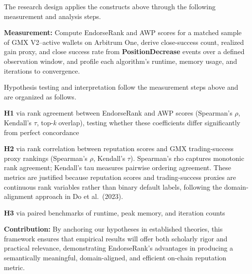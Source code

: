 The research design applies the constructs above through the following measurement and analysis steps.

\textbf{Measurement: }Compute EndorseRank and AWP scores for a matched sample of GMX V2--active wallets on Arbitrum One, derive close-success count, realized gain proxy, and close success rate from \textbf{PositionDecrease} events over a defined observation window, and profile each algorithm's runtime, memory usage, and iterations to convergence.


Hypothesis testing and interpretation follow the measurement steps above and are organized as follows.



\textbf{H1 }via rank agreement between EndorseRank and AWP scores (Spearman's \emph{\(\rho\)}, Kendall's \emph{\(\tau\)}, top-\emph{k} overlap), testing whether these coefficients differ significantly from perfect concordance


\textbf{H2 }via rank correlation between reputation scores and GMX trading-success proxy rankings (Spearman's \emph{\(\rho\)}, Kendall's \emph{\(\tau\)}). Spearman's rho captures monotonic rank agreement; Kendall's tau measures pairwise ordering agreement. These metrics are justified because reputation scores and trading-success proxies are continuous rank variables rather than binary default labels, following the domain-alignment approach in Do et al.\ (2023).


\textbf{H3 }via paired benchmarks of runtime, peak memory, and iteration counts


\textbf{Contribution: }By anchoring our hypotheses in established theories, this framework ensures that empirical results will offer both scholarly rigor and practical relevance, demonstrating EndorseRank's advantages in producing a semantically meaningful, domain-aligned, and efficient on-chain reputation metric.
